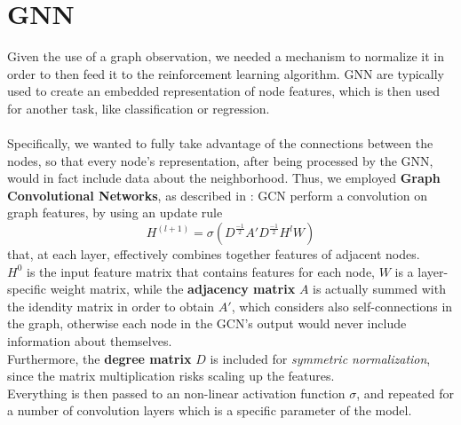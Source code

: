 \section{GNN}
Given the use of a graph observation, we needed a mechanism to normalize it in order to then feed it to the reinforcement learning algorithm. GNN are typically used to create an embedded representation of node features, which is then used for another task, like classification or regression. \\ \\

\noindent
Specifically, we wanted to fully take advantage of the connections between the nodes, so that every node's representation, after being processed by the GNN, would in fact include data about the neighborhood. Thus, we employed \textbf{Graph Convolutional Networks}, as described in \cite{gcn}: GCN perform a convolution on graph features, by using an update rule 
$$H^{(l + 1)} = \sigma(D^{\frac{-1}{2}} A' D^{\frac{-1}{2}} H^{l} W )$$ that, at each layer, effectively combines together features of adjacent nodes.\\ $H^0$ is the input feature matrix that contains features for each node, $W$ is a layer-specific weight matrix, while the \textbf{adjacency matrix} $A$ is actually summed with the idendity matrix in order to obtain $A'$, which considers also self-connections in the graph, otherwise each node in the GCN's output would never include information about themselves. \\
Furthermore, the \textbf{degree matrix} $D$ is included for \textit{symmetric normalization}, since the matrix multiplication risks scaling up the features.\\
Everything is then passed to an non-linear activation function $\sigma$, and repeated for a number of convolution layers which is a specific parameter of the model.\\ \\


